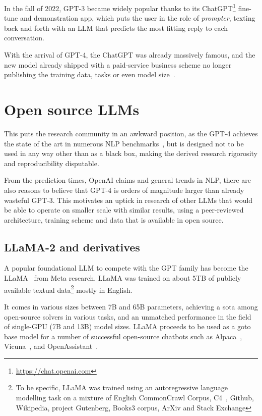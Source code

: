 In the fall of 2022, GPT-3 became widely popular thanks to its \textsf{ChatGPT}\footnote{\url{https://chat.openai.com}} fine-tune and demonstration app, which puts the user in the role of \textit{prompter}, texting back and forth with an LLM that predicts the most fitting reply to each conversation.

With the arrival of GPT-4, the \textsf{ChatGPT} was already massively famous, and the new model already shipped with a paid-service business scheme no longer publishing the training data, tasks or even model size~\cite{gpt4}.

\section{Open source LLMs}
This puts the research community in an awkward position, as the GPT-4 achieves the state of the art in numerous NLP benchmarks~\cite{gpt4,Liu_2023}, but is designed not to be used in any way other than as a black box, making the derived research rigorosity and reproducibility disputable.

From the prediction times, \textsf{OpenAI} claims and general trends in NLP, there are also reasons to believe that GPT-4 is orders of magnitude larger than already wasteful GPT-3.
This motivates an uptick in research of other LLMs that would be able to operate on smaller scale with similar results, using a peer-reviewed architecture, training scheme and data that is available in open source.

\subsection{LLaMA-2 and derivatives}
\label{sec:llama}

A popular foundational LLM to compete with the GPT family has become the \textsf{LLaMA}~\cite{llama} from \textsf{Meta research}. LLaMA was trained on about 5TB of publicly available  textual data\footnote{To be specific, LLaMA was trained using an autoregressive language modelling task on a mixture of English CommonCrawl Corpus, C4~\cite{raffel2020exploring}, Github, Wikipedia, project Gutenberg, Books3 corpus, ArXiv and Stack Exchange} mostly in English. 

It comes in various sizes between 7B and 65B parameters, achieving a sota among open-source solvers in various tasks, and an unmatched performance in the field of single-GPU (7B and 13B) model sizes.
LLaMA proceeds to be used as a goto base model for a number of successful open-source chatbots such as Alpaca~\cite{alpaca}, Vicuna~\cite{vicuna}, and OpenAssistant~\cite{openassistant}.

